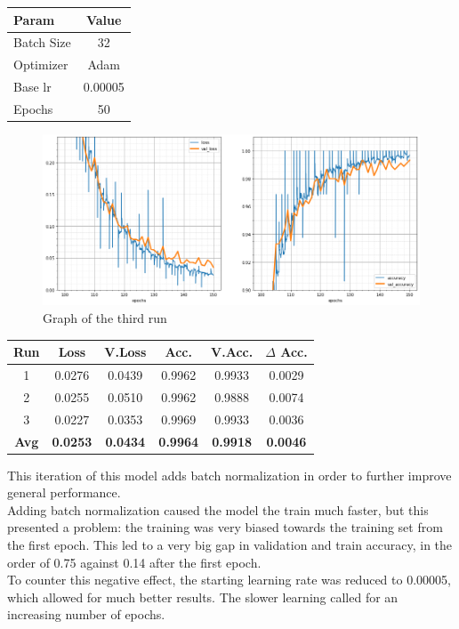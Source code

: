 \begin{table}[H]
	\centering
	\begin{tabular}{lc}
	\textbf{Param} & \textbf{Value}\\ \hline
	Batch Size 	& 32 \\
	Optimizer 	& Adam \\
	Base lr		& 0.00005 \\
	Epochs		& 50 \\
	\end{tabular}
\end{table}


\begin{figure}[H]
	\begin{center}
	\includegraphics[width=\linewidth]{Immagini/bn}
	\caption{Graph of the third run}
	\end{center}
\end{figure}
\begin{table}[H]
	\centering
	\begin{tabular}{cccccc}
		\textbf{Run} &\textbf{Loss}&\textbf{V.Loss} &\textbf{Acc.}&\textbf{V.Acc.}&\textbf{$\Delta$ Acc.} \\ \hline
	1   & 0.0276    & 0.0439    & 0.9962    & 0.9933    & 0.0029\\
	2   & 0.0255    & 0.0510    & 0.9962    & 0.9888    & 0.0074\\
	3   & 0.0227    & 0.0353    & 0.9969    & 0.9933    & 0.0036\\
	\textbf{Avg} & \textbf{0.0253}    & \textbf{0.0434}    & \textbf{0.9964}    & \textbf{0.9918}    & \textbf{0.0046}\\ 
	\end{tabular}
\end{table}

This iteration of this model adds batch normalization in order to further improve general performance.\\
Adding batch normalization caused the model the train much faster, but this presented a problem: the training was very biased towards the training set from the first epoch. This led to a very big gap in validation and train accuracy, in the order of 0.75 against 0.14 after the first epoch.\\
To counter this negative effect, the starting learning rate was reduced to 0.00005, which allowed for much better results. The slower learning called for an increasing number of epochs.




